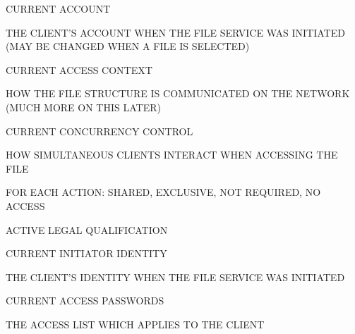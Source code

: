 \begin{bwslide}

\begin{nrtc}
\item	CURRENT ACCOUNT
    \begin{nrtc}
    \item	THE CLIENT'S ACCOUNT WHEN THE FILE SERVICE WAS INITIATED
		(MAY BE CHANGED WHEN A FILE IS SELECTED)
    \end{nrtc}

\item	CURRENT ACCESS CONTEXT
    \begin{nrtc}
    \item	HOW THE FILE STRUCTURE IS COMMUNICATED ON THE NETWORK
		(MUCH MORE ON THIS LATER)
    \end{nrtc}

\item	CURRENT CONCURRENCY CONTROL
    \begin{nrtc}
    \item	HOW SIMULTANEOUS CLIENTS INTERACT WHEN ACCESSING THE FILE

    \item	FOR EACH ACTION: SHARED, EXCLUSIVE, NOT REQUIRED, NO ACCESS
    \end{nrtc}
\end{nrtc}
\end{bwslide}


\begin{bwslide}

\begin{nrtc}
\item	ACTIVE LEGAL QUALIFICATION

\item	CURRENT INITIATOR IDENTITY
    \begin{nrtc}
    \item	THE CLIENT'S IDENTITY WHEN THE FILE SERVICE WAS INITIATED
    \end{nrtc}

\item	CURRENT ACCESS PASSWORDS
    \begin{nrtc}
    \item	THE ACCESS LIST WHICH APPLIES TO THE CLIENT
    \end{nrtc}
\end{nrtc}
\end{bwslide}


